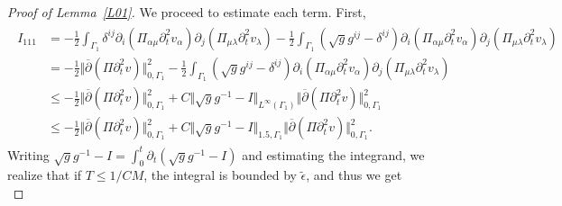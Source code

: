 \documentclass[10pt,reqno]{amsart}
\theoremstyle{plain}
\theoremstyle{definition}
\numberwithin{equation}{section}
\newcommand{\ccP}{\mathscr{P}}
\newcommand{\al}{\alpha}
\newcommand{\Ga}{\Gamma}
\newcommand{\de}{\delta}
\newcommand{\la}{\lambda}
\newcommand{\norm}[1]{\Vert#1\Vert}
\begin{document}
\begin{proof}[Proof of Lemma~\ref{L01}]
We proceed to estimate each term. First,
\begin{align}
\begin{split}
 I_{111} & = 
 -\frac{1}{2} \int_{\Ga_1} 
 \de^{ij}\partial_i (\Pi_{\al\mu} \partial^2_t v_\al) \partial_j (\Pi_{\mu\la}  \partial^2_tv_\la)
-\frac{1}{2} \int_{\Ga_1} 
(\sqrt{g} g^{ij} - \de^{ij} )\partial_i (\Pi_{\al\mu} \partial^2_t v_\al) \partial_j (\Pi_{\mu\la}  \partial^2_tv_\la)
\\
& 
= -\frac{1}{2} \norm{ \overline{\partial} (\Pi \partial^2_t v) }^2_{0,\Ga_1}
-\frac{1}{2} \int_{\Ga_1} 
(\sqrt{g} g^{ij} - \de^{ij} )\partial_i (\Pi_{\al\mu} \partial^2_t v_\al) \partial_j (\Pi_{\mu\la}  \partial^2_tv_\la)
\\
& 
\leq
-\frac{1}{2} \norm{ \overline{\partial} (\Pi \partial^2_t v) }^2_{0,\Ga_1}
+ C\norm{ \sqrt{g} g^{-1} - I }_{L^\infty(\Ga_1)} 
\norm{ \overline{\partial} (\Pi \partial^2_t v) }^2_{0,\Ga_1}
\\
&
\leq 
 -\frac{1}{2} \norm{ \overline{\partial} (\Pi \partial^2_t v) }^2_{0,\Ga_1}
+ C\norm{ \sqrt{g} g^{-1} - I }_{1.5,\Ga_1} 
\norm{ \overline{\partial} (\Pi \partial^2_t v) }^2_{0,\Ga_1}.
\end{split}
\nonumber
\end{align}
Writing
$\sqrt{g} g^{-1} - I =
\int_{0}^{t}\partial_{t}(\sqrt{g} g^{-1} - I)$
and estimating the integrand, we realize that if
$T\le 1/C M$, the integral is bounded by $\widetilde{\epsilon}$,
and thus we get
  \begin{equation*}

\end{equation*}
\end{proof}
\end{document}
